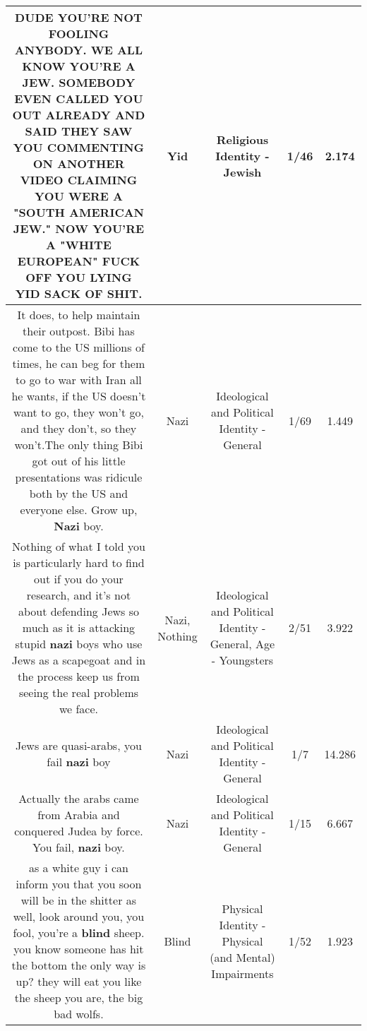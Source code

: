 \documentclass[11pt]{article}
\newlength\mylength
\begin{document}
\begin{center}
\begin{longtable}{|C{.65\mylength}|C{.30\mylength}|C{.12\mylength}|C{.12\mylength}|C{.12\mylength}|}
  \small DUDE YOU'RE NOT FOOLING ANYBODY. WE ALL KNOW YOU'RE A JEW. SOMEBODY EVEN CALLED YOU OUT ALREADY AND SAID THEY SAW YOU COMMENTING ON ANOTHER VIDEO CLAIMING YOU WERE A "SOUTH AMERICAN JEW." NOW YOU'RE A "WHITE EUROPEAN" FUCK OFF YOU LYING \textbf{YID} SACK OF SHIT.\normalsize   & Yid & Religious Identity - Jewish & 1/46 & 2.174 \\  \hline
  \small It does, to help maintain their outpost. Bibi has come to the US millions of times, he can beg for them to go to war with Iran all he wants, if the US doesn't want to go, they won't go, and they don't, so they won't.The only thing Bibi got out of his little presentations was ridicule both by the US and everyone else. Grow up, \textbf{Nazi} boy.\normalsize   & Nazi &  Ideological and Political Identity - General & 1/69 & 1.449 \\  \hline
  \small Nothing of what I told you is particularly hard to find out if you do your research, and it's not about defending Jews so much as it is attacking stupid \textbf{nazi} boys who use Jews as a scapegoat and in the process keep us from seeing the real problems we face.\normalsize   & Nazi, Nothing &  Ideological and Political Identity - General, Age - Youngsters & 2/51 & 3.922 \\  \hline
  \small Jews are quasi-arabs, you fail \textbf{nazi} boy\normalsize   & Nazi &  Ideological and Political Identity - General & 1/7 & 14.286 \\  \hline
  \small Actually the arabs came from Arabia and conquered Judea by force. You fail, \textbf{nazi} boy.\normalsize   & Nazi &  Ideological and Political Identity - General & 1/15 & 6.667 \\  \hline
  \small as a white guy i can inform you that you soon will be in the shitter as well, look around you, you fool, you're a \textbf{blind} sheep. you know someone has hit the bottom the only way is up? they will eat you like the sheep you are, the big bad wolfs.\normalsize   & Blind & Physical Identity - Physical (and Mental) Impairments & 1/52 & 1.923 \\  \hline

\end{longtable}
\end{center}
\end{document}
